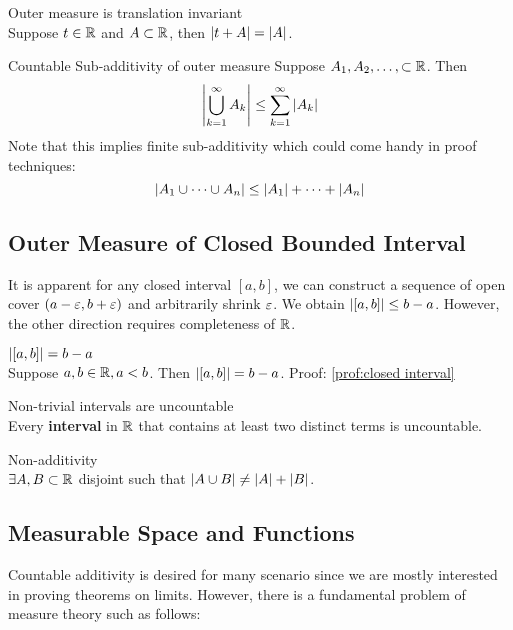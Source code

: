 \begin{prop}{Outer measure is translation invariant}\\
Suppose $t\in {\mathbb{R}}$ and $A\subset {\mathbb{R}}$, then $\abs{t+A} = \abs{A}$.
\end{prop}

\begin{prop}{Countable Sub-additivity of outer measure}
Suppose $A_1, A_2, \dots, \subset {\mathbb{R}}$. Then 
$$\abs{\bigcup_{k=1}^\infty A_k} \leq \sum_{k=1}^\infty \abs{A_k}$$	
Note that this implies finite sub-additivity which could come handy in proof techniques: 
$$\abs{A_1\cup \dots \cup A_n} \leq \abs{A_1} + \dots + \abs{A_n}$$
\end{prop}

\subsection{Outer Measure of Closed Bounded Interval}
It is apparent for any closed interval $[a, b]$, we can construct a sequence of open cover $(a-{\varepsilon}, b+{\varepsilon})$ and arbitrarily shrink ${\varepsilon}$. We obtain $\abs{[a, b]} \leq b-a$. However, the other direction requires completeness of ${\mathbb{R}}$. \\

\begin{prop}{$\abs{[a, b]} = b-a$}\\
Suppose $a, b\in {\mathbb{R}}, a<b$. Then $\abs{[a, b]} = b-a$. 
Proof: \ref{prof:closed interval}
\end{prop}

\begin{prop}{Non-trivial intervals are uncountable}\\
	Every \textbf{interval} in ${\mathbb{R}}$ that contains at least two distinct terms is uncountable. 
\end{prop}

\begin{prop}{Non-additivity}\\
	$\exists A, B\subset {\mathbb{R}}$ disjoint such that $\abs{A\cup B} \neq \abs{A} + \abs{B}$. 
\end{prop}

\subsection{Measurable Space and Functions}
Countable additivity is desired for many scenario since we are mostly interested in proving theorems on limits. However, there is a fundamental problem of measure theory such as follows: \\

